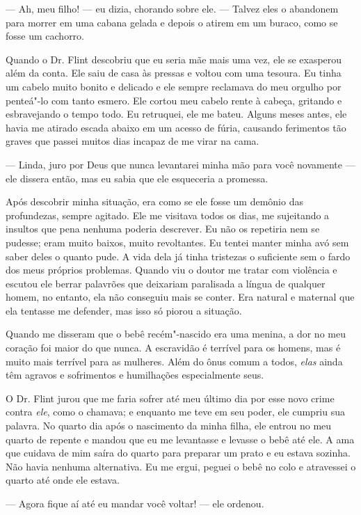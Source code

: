 --- Ah, meu filho! --- eu dizia, chorando sobre ele. --- Talvez eles o
abandonem para morrer em uma cabana gelada e depois o atirem em um
buraco, como se fosse um cachorro.

Quando o Dr. Flint descobriu que eu
seria mãe mais uma vez, ele se exasperou além da conta. Ele saiu de casa
às pressas e voltou com uma tesoura. Eu tinha um cabelo muito bonito e
delicado e ele sempre reclamava do meu orgulho por penteá"-lo com tanto
esmero. Ele cortou meu cabelo rente à cabeça, gritando e esbravejando o
tempo todo. Eu retruquei, ele me bateu. Alguns meses antes, ele havia me
atirado escada abaixo em um acesso de fúria, causando ferimentos tão
graves que passei muitos dias incapaz de me virar na cama.

--- Linda, juro por Deus que nunca levantarei minha mão para você
novamente --- ele dissera então, mas eu sabia que ele esqueceria a
promessa.

Após descobrir minha situação, era como
se ele fosse um demônio das profundezas, sempre agitado. Ele me visitava
todos os dias, me sujeitando a insultos que pena nenhuma poderia
descrever. Eu não os repetiria nem se pudesse; eram muito baixos, muito
revoltantes. Eu tentei manter minha avó sem saber deles o quanto pude. A
vida dela já tinha tristezas o suficiente sem o fardo dos meus próprios
problemas. Quando viu o doutor me tratar com violência e escutou ele
berrar palavrões que deixariam paralisada a língua de qualquer homem, no
entanto, ela não conseguiu mais se conter. Era natural e maternal que
ela tentasse me defender, mas isso só piorou a situação.

Quando me disseram que o bebê
recém"-nascido era uma menina, a dor no meu coração foi maior do que
nunca. A escravidão é terrível para os homens, mas é muito mais terrível
para as mulheres. Além do ônus comum a todos, \emph{elas} ainda têm
agravos e sofrimentos e humilhações especialmente seus.

O Dr. Flint jurou que me faria sofrer
até meu último dia por esse novo crime contra \emph{ele}, como o
chamava; e enquanto me teve em seu poder, ele cumpriu sua palavra. No
quarto dia após o nascimento da minha filha, ele entrou no meu quarto de
repente e mandou que eu me levantasse e levasse o bebê até ele. A ama
que cuidava de mim saíra do quarto para preparar um prato e eu estava
sozinha. Não havia nenhuma alternativa. Eu me ergui, peguei o bebê no
colo e atravessei o quarto até onde ele estava.

--- Agora fique aí até eu mandar você voltar! --- ele ordenou.

